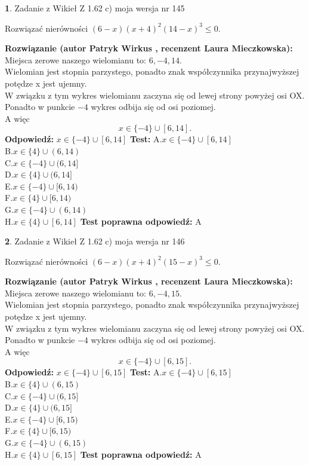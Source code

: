\documentclass[12pt, a4paper]{article}
\theoremstyle{definition} %
\newtheorem{zad}{}
\newcommand{\zadStart}[1]{\begin{zad}#1\newline}
\newcommand{\zadStop}{\end{zad}}
\newcommand{\rozwStart}[2]{\noindent \textbf{Rozwiązanie (autor #1 , recenzent #2): }\newline}
\newcommand{\rozwStop}{\newline}
\newcommand{\odpStart}{\noindent \textbf{Odpowiedź:}\newline}
\newcommand{\odpStop}{\newline}
\newcommand{\testStart}{\noindent \textbf{Test:}\newline}
\newcommand{\testStop}{\newline}
\newcommand{\kluczStart}{\noindent \textbf{Test poprawna odpowiedź:}\newline}
\newcommand{\kluczStop}{\newline}
\begin{document}
\zadStart{Zadanie z Wikieł Z 1.62 c) moja wersja nr 145}

Rozwiązać nierówności $(6-x)(x+4)^{2}(14-x)^{3}\le0$.
\zadStop
\rozwStart{Patryk Wirkus}{Laura Mieczkowska}
Miejsca zerowe naszego wielomianu to: $6, -4, 14$.\\
Wielomian jest stopnia parzystego, ponadto znak współczynnika przy\linebreak najwyższej potędze x jest ujemny.\\ W związku z tym wykres wielomianu zaczyna się od lewej strony powyżej osi OX.\\
Ponadto w punkcie $-4$ wykres odbija się od osi poziomej.\\
A więc $$x \in \{-4\} \cup [6,14].$$
\rozwStop
\odpStart
$x \in \{-4\} \cup [6,14]$
\odpStop
\testStart
A.$x \in \{-4\} \cup [6,14]$\\
B.$x \in \{4\} \cup (6,14)$\\
C.$x \in \{-4\} \cup (6,14]$\\
D.$x \in \{4\} \cup (6,14]$\\
E.$x \in \{-4\} \cup [6,14)$\\
F.$x \in \{4\} \cup [6,14)$\\
G.$x \in \{-4\} \cup (6,14)$\\
H.$x \in \{4\} \cup [6,14]$
\testStop
\kluczStart
A
\kluczStop



\zadStart{Zadanie z Wikieł Z 1.62 c) moja wersja nr 146}

Rozwiązać nierówności $(6-x)(x+4)^{2}(15-x)^{3}\le0$.
\zadStop
\rozwStart{Patryk Wirkus}{Laura Mieczkowska}
Miejsca zerowe naszego wielomianu to: $6, -4, 15$.\\
Wielomian jest stopnia parzystego, ponadto znak współczynnika przy\linebreak najwyższej potędze x jest ujemny.\\ W związku z tym wykres wielomianu zaczyna się od lewej strony powyżej osi OX.\\
Ponadto w punkcie $-4$ wykres odbija się od osi poziomej.\\
A więc $$x \in \{-4\} \cup [6,15].$$
\rozwStop
\odpStart
$x \in \{-4\} \cup [6,15]$
\odpStop
\testStart
A.$x \in \{-4\} \cup [6,15]$\\
B.$x \in \{4\} \cup (6,15)$\\
C.$x \in \{-4\} \cup (6,15]$\\
D.$x \in \{4\} \cup (6,15]$\\
E.$x \in \{-4\} \cup [6,15)$\\
F.$x \in \{4\} \cup [6,15)$\\
G.$x \in \{-4\} \cup (6,15)$\\
H.$x \in \{4\} \cup [6,15]$
\testStop
\kluczStart
A
\kluczStop
\end{document}
